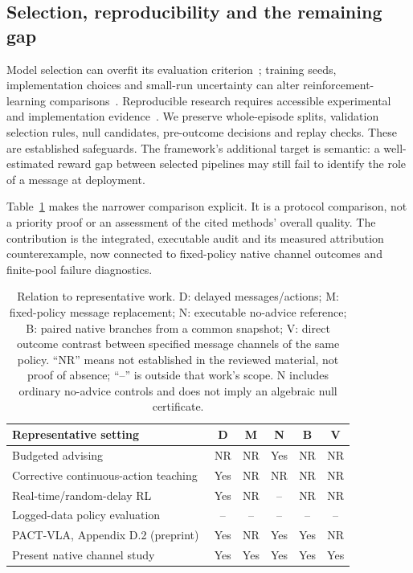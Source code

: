 \subsection{Selection, reproducibility and the remaining gap}
Model selection can overfit its evaluation criterion~\cite{cawley,varma}; training seeds, implementation choices and small-run uncertainty can alter reinforcement-learning comparisons~\cite{henderson,agarwal}. Reproducible research requires accessible experimental and implementation evidence~\cite{pineau}. We preserve whole-episode splits, validation selection rules, null candidates, pre-outcome decisions and replay checks. These are established safeguards. The framework's additional target is semantic: a well-estimated reward gap between selected pipelines may still fail to identify the role of a message at deployment.

Table~\ref{tab:related} makes the narrower comparison explicit. It is a protocol comparison, not a priority proof or an assessment of the cited methods' overall quality. The contribution is the integrated, executable audit and its measured attribution counterexample, now connected to fixed-policy native channel outcomes and finite-pool failure diagnostics.
\begin{table}[tb]\centering\small
\caption{Relation to representative work. D: delayed messages/actions; M: fixed-policy message replacement; N: executable no-advice reference; B: paired native branches from a common snapshot; V: direct outcome contrast between specified message channels of the same policy. ``NR'' means not established in the reviewed material, not proof of absence; ``--'' is outside that work's scope. N includes ordinary no-advice controls and does not imply an algebraic null certificate.}\label{tab:related}
\setlength{\tabcolsep}{4pt}
\begin{tabular}{p{6.1cm}ccccc}\toprule Representative setting & D & M & N & B & V\\\midrule
Budgeted advising~\cite{torrey,fachantidis} & NR & NR & Yes & NR & NR\\
Corrective continuous-action teaching~\cite{celemin} & Yes & NR & NR & NR & NR\\
Real-time/random-delay RL~\cite{ramstedt,randomdelay} & Yes & NR & -- & NR & NR\\
Logged-data policy evaluation~\cite{dudik,jiang,thomas} & -- & -- & -- & -- & --\\
PACT-VLA, Appendix D.2 (preprint) & Yes & NR & Yes & Yes & NR\\
Present native channel study & Yes & Yes & Yes & Yes & Yes\\\bottomrule
\end{tabular}
\end{table}
